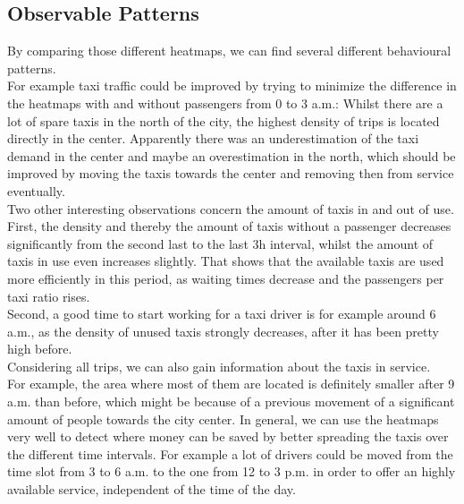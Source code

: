 \documentclass[11pt,conference,a4paper,twocolumns,romanappendices]{IEEEtran}
\begin{document}
\subsection{Observable Patterns}
By comparing those different heatmaps, we can find several different behavioural patterns. \\
For example taxi traffic could be improved by trying to minimize the difference in the heatmaps with and without passengers from 0 to 3 a.m.: Whilst there are a lot of spare taxis in the north of the city, the highest density of trips is located directly in the center. Apparently there was an underestimation of the taxi demand in the center and maybe an overestimation in the north, which should be improved by moving the taxis towards the center and removing then from service eventually.\\
Two other interesting observations concern the amount of taxis in and out of use. \\
First, the density and thereby the amount of taxis without a passenger decreases significantly from the second last to the last 3h interval, whilst the amount of taxis in use even increases slightly. That shows that the available taxis are used more efficiently in this period, as waiting times decrease and the passengers per taxi ratio rises. \\
Second, a good time to start working for a taxi driver is for example around 6 a.m., as the density of unused taxis strongly decreases, after it has been pretty high before. \\
Considering all trips, we can also gain information about the taxis in service. \\
For example, the area where most of them are located is definitely smaller after 9 a.m. than before, which might be because of a previous movement of a significant amount of people towards the city center. In general, we can use the heatmaps very well to detect where money can be saved by better spreading the taxis over the different time intervals. For example a lot of drivers could be moved from the time slot from 3 to 6 a.m. to the one from 12 to 3 p.m. in order to offer an highly available service, independent of the time of the day. \\
\end{document}
